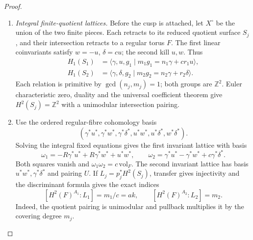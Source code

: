 \begin{proof}
\begin{enumerate}[label=\arabic*.,leftmargin=*]
\item \emph{Integral finite-quotient lattices.}
Before the cusp is attached, let $X^\circ$ be the union of the two
finite pieces. Each retracts to its reduced quotient surface $S_j$,
and their intersection retracts to a regular torus $F$.
The first linear coinvariants satisfy $w=-u$, $\delta=cu$;
the second kill $u,w$. Thus
\[
 \begin{split}
 H_1(S_1)&=\langle\gamma,u,g_1\mid
             m_1g_1=n_1\gamma+cr_1u\rangle,\\
 H_1(S_2)&=\langle\gamma,\delta,g_2\mid
             m_2g_2=n_2\gamma+r_2\delta\rangle.
 \end{split}
\]
Each relation is primitive by $\gcd(n_j,m_j)=1$; both groups are
$\mathbb Z^2$. Euler characteristic zero, duality and the universal
coefficient theorem give $H^2(S_j)=\mathbb Z^2$ with a unimodular
intersection pairing.

\item Use the ordered regular-fibre cohomology basis
\[
 (\gamma^*u^*,\gamma^*w^*,\gamma^*\delta^*,
            u^*w^*,u^*\delta^*,w^*\delta^*).
\]
Solving the integral fixed equations gives the first invariant
lattice with basis
\[
 \omega_1=-R\gamma^*u^*+R\gamma^*w^*+u^*w^*,\qquad
 \omega_2=\gamma^*u^*-\gamma^*w^*+c\gamma^*\delta^*.
\]
Both squares vanish and $\omega_1\omega_2=c\,\mathrm{vol}_F$.
The second invariant lattice has basis
$u^*w^*,\gamma^*\delta^*$ and pairing $U$.
If $L_j=p_j^*H^2(S_j)$, transfer gives injectivity and the
discriminant formula gives the exact indices
\[
 [H^2(F)^{A_1}:L_1]=m_1/c=ak,
 \qquad [H^2(F)^{A_2}:L_2]=m_2.
\]
Indeed, the quotient pairing is unimodular and pullback multiplies
it by the covering degree $m_j$.


\end{enumerate}
\end{proof}
